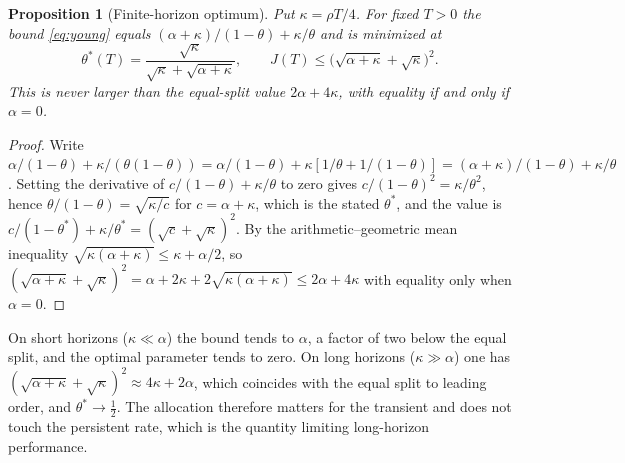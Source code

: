 \documentclass[11pt,notitlepage]{report}
\newtheorem{proposition}[theorem]{Proposition}
\theoremstyle{definition}
\theoremstyle{remark}
\begin{document}
\begin{proposition}[Finite-horizon optimum]\label{prop:finiteyoung}
Put $\kappa=\rho T/4$. For fixed $T>0$ the bound \eqref{eq:young} equals $(\alpha+\kappa)/(1-\theta)+\kappa/\theta$ and is minimized at
\[
\theta^*(T)=\frac{\sqrt\kappa}{\sqrt\kappa+\sqrt{\alpha+\kappa}},\qquad J(T)\le\bigl(\sqrt{\alpha+\kappa}+\sqrt\kappa\bigr)^2.
\]
This is never larger than the equal-split value $2\alpha+4\kappa$, with equality if and only if $\alpha=0$.
\end{proposition}
\begin{proof}
Write $\alpha/(1-\theta)+\kappa/(\theta(1-\theta))=\alpha/(1-\theta)+\kappa[1/\theta+1/(1-\theta)]=(\alpha+\kappa)/(1-\theta)+\kappa/\theta$. Setting the derivative of $c/(1-\theta)+\kappa/\theta$ to zero gives $c/(1-\theta)^2=\kappa/\theta^2$, hence $\theta/(1-\theta)=\sqrt{\kappa/c}$ for $c=\alpha+\kappa$, which is the stated $\theta^*$, and the value is $c/(1-\theta^*)+\kappa/\theta^*=(\sqrt c+\sqrt\kappa)^2$. By the arithmetic--geometric mean inequality $\sqrt{\kappa(\alpha+\kappa)}\le\kappa+\alpha/2$, so $(\sqrt{\alpha+\kappa}+\sqrt\kappa)^2=\alpha+2\kappa+2\sqrt{\kappa(\alpha+\kappa)}\le2\alpha+4\kappa$ with equality only when $\alpha=0$.
\end{proof}
On short horizons ($\kappa\ll\alpha$) the bound tends to $\alpha$, a factor of two below the equal split, and the optimal parameter tends to zero. On long horizons ($\kappa\gg\alpha$) one has $(\sqrt{\alpha+\kappa}+\sqrt\kappa)^2\approx4\kappa+2\alpha$, which coincides with the equal split to leading order, and $\theta^*\to\tfrac12$. The allocation therefore matters for the transient and does not touch the persistent rate, which is the quantity limiting long-horizon performance.
\end{document}
